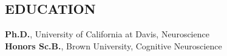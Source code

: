 \documentclass[line,margin,10pt]{res}
\begin{document}
\begin{resume}
\section{EDUCATION} 
\textbf{Ph.D.}, University of California at Davis, Neuroscience\\
\textbf{Honors Sc.B.}, Brown University, Cognitive Neuroscience%
 
%
%
%
  



 

\end{resume}
\end{document}
